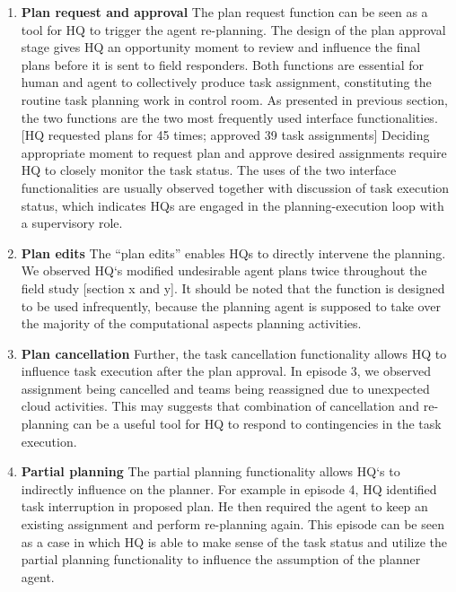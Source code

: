 \begin{enumerate}


\item \textbf{ Plan request and approval } The plan request function can be seen as a tool for HQ to trigger the agent re-planning. The design of the plan approval stage gives HQ an opportunity moment to review and influence the final plans before it is sent to field responders. Both functions are essential for human and agent to collectively produce task assignment, constituting the routine task planning work in control room. As presented in previous section, the two functions are the two most frequently used interface functionalities. [HQ requested plans for 45 times; approved 39 task assignments] Deciding appropriate moment to request plan and approve desired assignments require HQ to closely monitor the task status. The uses of the two interface functionalities are usually observed together with discussion of task execution status, which indicates HQs are engaged in the planning-execution loop with a supervisory role. \\

\item \textbf{ Plan edits } The ``plan edits'' enables HQs to directly intervene the planning. We observed HQ`s modified undesirable agent plans twice throughout the field study [section x and y]. It should be noted that the function is designed to be used infrequently, because the planning agent is supposed to take over the majority of the computational aspects planning activities. \\

\item \textbf{ Plan cancellation } Further, the task cancellation functionality allows HQ to influence task execution after the plan approval. In episode 3, we observed assignment being cancelled and teams being reassigned due to unexpected cloud activities. This may suggests that combination of cancellation and re-planning can be a useful tool for HQ to respond to contingencies in the task execution.\\

\item \textbf{ Partial planning } The partial planning functionality allows HQ`s to indirectly influence on the planner. For example in episode 4, HQ identified task interruption in proposed plan. He then required the agent to keep an existing assignment and perform re-planning again.  This episode can be seen as a case in which HQ is able to make sense of the task status and utilize the partial planning functionality to influence the assumption of the planner agent. \\

\end{enumerate}

